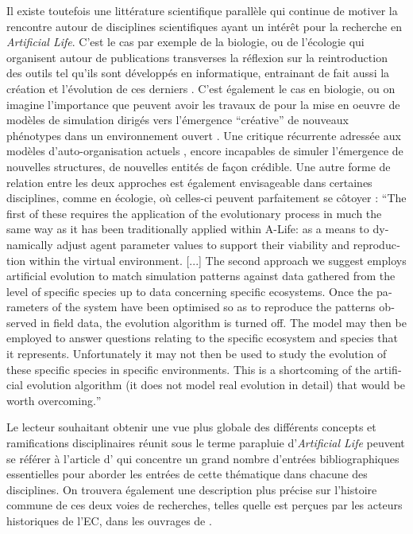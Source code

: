 Il existe toutefois une littérature scientifique parallèle qui continue de motiver la rencontre autour de disciplines scientifiques ayant un intérêt pour la recherche en \textit{Artificial Life}. C'est le cas par exemple de la biologie, ou de l'écologie \autocite{Hamblin2013} qui organisent autour de publications transverses la réflexion sur la reintroduction des outils tel qu'ils sont développés en informatique, entrainant de fait aussi la création et l'évolution de ces derniers \autocite{Hogeweg2011}. C'est également le cas en biologie, ou on imagine l'importance que peuvent avoir les travaux de \textcites{Taylor2001}[221]{Taylor1999} pour la mise en oeuvre de modèles de simulation dirigés vers l'émergence \enquote{créative} de nouveaux phénotypes dans un environnement ouvert \autocite[33]{Taylor1999}. Une critique récurrente adressée aux modèles d'auto-organisation actuels \autocite{Pumain2003}, encore incapables de simuler l'émergence de nouvelles structures, de nouvelles entités de façon crédible. Une autre forme de relation entre les deux approches est également envisageable dans certaines disciplines, comme en écologie, où celles-ci peuvent parfaitement se côtoyer : \foreignquote{english}{The first of these requires the application of the evolutionary process in much the same way as it has been traditionally applied within A-Life: as a means to dynamically adjust agent parameter values to support their viability and reproduction within the virtual environment. [...] The second approach we suggest employs artificial evolution to match simulation patterns against data gathered from the level of specific species up to data concerning specific ecosystems. Once the parameters of the system have been optimised so as to reproduce the patterns observed in field data, the evolution algorithm is turned off. The model may then be employed to answer questions relating to the specific ecosystem and species that it represents. Unfortunately it may not then be used to study the evolution of these specific species in specific environments. This is a shortcoming of the artificial evolution algorithm (it does not model real evolution in detail) that would be worth overcoming.} \autocite{Dorin2008}

Le lecteur souhaitant obtenir une vue plus globale des différents concepts et ramifications disciplinaires réunit sous le terme parapluie d'\textit{Artificial Life} peuvent se référer à l'article d'\textcite{Aguilar2014} qui concentre un grand nombre d'entrées bibliographiques essentielles pour aborder les entrées de cette thématique dans chacune des disciplines. On trouvera également une description plus précise sur l'histoire commune de ces deux voies de recherches, telles quelle est perçues par les acteurs historiques de l'EC, dans les ouvrages de \autocites{DeJong2006a, Fogel1998, Fogel2006a, Fogel2006b, Back1996, Back1997}.

